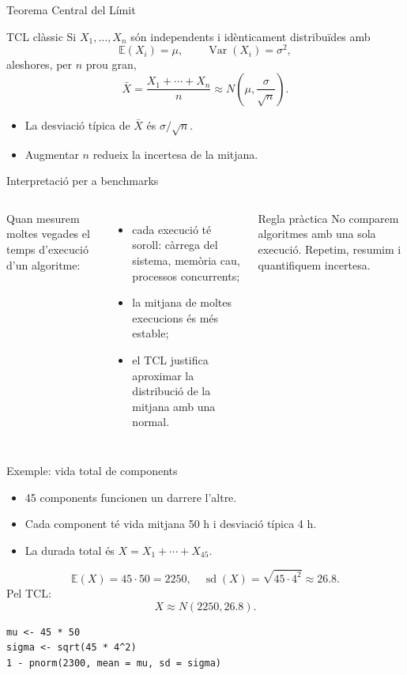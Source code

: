 \documentclass[10pt,aspectratio=169]{beamer}
\newcommand{\E}{\mathbb{E}}
\newcommand{\Var}{\operatorname{Var}}
\begin{document}
\begin{frame}[fragile]{Teorema Central del Límit}
\begin{block}{TCL clàssic}
Si $X_1,\ldots,X_n$ són independents i idènticament distribuïdes amb
\[
\E(X_i)=\mu,\qquad \Var(X_i)=\sigma^2,
\]
aleshores, per $n$ prou gran,
\[
\bar X=\frac{X_1+\cdots+X_n}{n}\approx N\left(\mu,\frac{\sigma}{\sqrt n}\right).
\]
\end{block}
\begin{itemize}
  \item La desviació típica de $\bar X$ és $\sigma/\sqrt n$.
  \item Augmentar $n$ redueix la incertesa de la mitjana.
\end{itemize}
\end{frame}

\begin{frame}[fragile]{Interpretació per a benchmarks}
\begin{columns}[T]
Quan mesurem moltes vegades el temps d'execució d'un algoritme:
\begin{itemize}
  \item cada execució té soroll: càrrega del sistema, memòria cau, processos concurrents;
  \item la mitjana de moltes execucions és més estable;
  \item el TCL justifica aproximar la distribució de la mitjana amb una normal.
\end{itemize}
\begin{block}{Regla pràctica}
No comparem algoritmes amb una sola execució. Repetim, resumim i quantifiquem incertesa.
\end{block}
\end{columns}
\end{frame}

\begin{frame}[fragile]{Exemple: vida total de components}
\begin{itemize}
  \item 45 components funcionen un darrere l'altre.
  \item Cada component té vida mitjana 50 h i desviació típica 4 h.
  \item La durada total és $X=X_1+\cdots+X_{45}$.
\end{itemize}
\[
\E(X)=45\cdot 50=2250,
\quad
\operatorname{sd}(X)=\sqrt{45\cdot 4^2}\approx 26.8.
\]
Pel TCL:
\[
X\approx N(2250,26.8).
\]
\begin{lstlisting}
mu <- 45 * 50
sigma <- sqrt(45 * 4^2)
1 - pnorm(2300, mean = mu, sd = sigma)
\end{lstlisting}
\end{frame}
\end{document}

